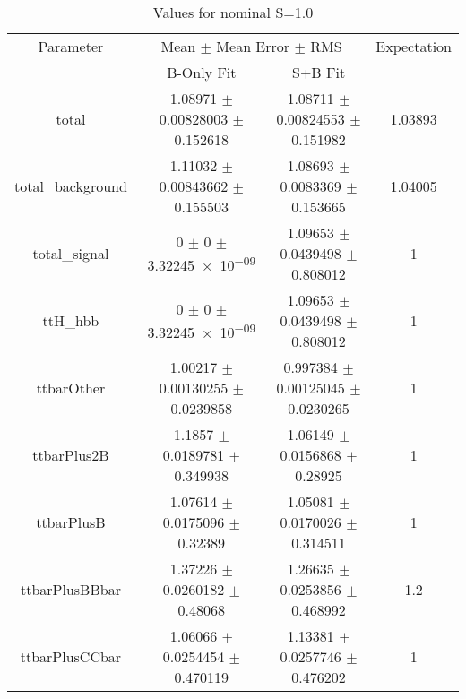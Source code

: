 \begin{table}
\centering
\caption{Values for nominal S=1.0}
\begin{tabular}{cccc}
\toprule
Parameter & \multicolumn{2}{c}{Mean $\pm$ Mean Error $\pm$ RMS} & Expectation\\
 & B-Only Fit & S+B Fit & \\
\midrule
total & \num{1.08971} $\pm$ \num{0.00828003} $\pm$ \num{0.152618} & \num{1.08711} $\pm$ \num{0.00824553} $\pm$ \num{0.151982} & \num{1.03893}\\
total\_background & \num{1.11032} $\pm$ \num{0.00843662} $\pm$ \num{0.155503} & \num{1.08693} $\pm$ \num{0.0083369} $\pm$ \num{0.153665} & \num{1.04005}\\
total\_signal & \num{0} $\pm$ \num{0} $\pm$ \num{3.32245e-09} & \num{1.09653} $\pm$ \num{0.0439498} $\pm$ \num{0.808012} & \num{1}\\
ttH\_hbb & \num{0} $\pm$ \num{0} $\pm$ \num{3.32245e-09} & \num{1.09653} $\pm$ \num{0.0439498} $\pm$ \num{0.808012} & \num{1}\\
ttbarOther & \num{1.00217} $\pm$ \num{0.00130255} $\pm$ \num{0.0239858} & \num{0.997384} $\pm$ \num{0.00125045} $\pm$ \num{0.0230265} & \num{1}\\
ttbarPlus2B & \num{1.1857} $\pm$ \num{0.0189781} $\pm$ \num{0.349938} & \num{1.06149} $\pm$ \num{0.0156868} $\pm$ \num{0.28925} & \num{1}\\
ttbarPlusB & \num{1.07614} $\pm$ \num{0.0175096} $\pm$ \num{0.32389} & \num{1.05081} $\pm$ \num{0.0170026} $\pm$ \num{0.314511} & \num{1}\\
ttbarPlusBBbar & \num{1.37226} $\pm$ \num{0.0260182} $\pm$ \num{0.48068} & \num{1.26635} $\pm$ \num{0.0253856} $\pm$ \num{0.468992} & \num{1.2}\\
ttbarPlusCCbar & \num{1.06066} $\pm$ \num{0.0254454} $\pm$ \num{0.470119} & \num{1.13381} $\pm$ \num{0.0257746} $\pm$ \num{0.476202} & \num{1}\\
\bottomrule
\end{tabular}
\end{table}